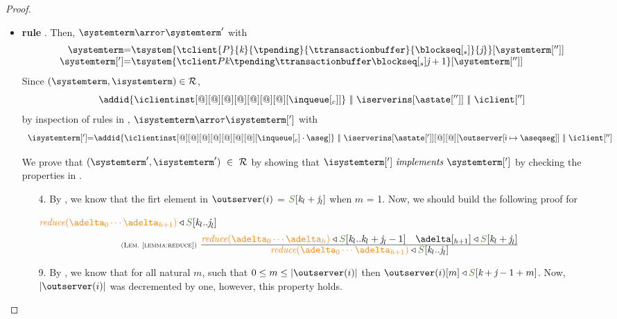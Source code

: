 \begin{proof}
\begin{itemize}
\begin{itemize}
\begin{enumerate}
					\end{enumerate}
				
				
				\item {\bf rule }. Then, $\systemterm  \arroi{\tau} \systemterm '$ with 
				\[\begin{array}{r@{=}l}
					\systemterm & \tsystem{\tclient{\tprogram}{\tknown}{\tpending}{\ttransactionbuffer}{\tsent}{\treceivebuffer}}[{\systemterm['']}]
					\\
					\systemterm['] & \tsystem{\tclienti{\tprogram}{\tknown}{\tpending}{\ttransactionbuffer}{\tsent}{\treceivebuffer+1}}[{\systemterm['']}]	
					
				  \end{array}
				\]
				Since $(\systemterm,\isystemterm)\in \mathcal{R}$,
				\[\addid{\iclientinst[@][@][@][@][@][@][@][\inclient]} \ \bigpar \ \iserverins[\astate['']] \ \bigpar\ \iclient['']\]
				by inspection of rules in \figref{}, 
				$\isystemterm \arroi{\tau} \isystemterm[']$ with
				\[\begin{array}{r@{=}l}
					\isystemterm['] & \addid{\iclientinst[@][@][@][@][@][@][@][\inclient\cdot \aseg]} \ \bigpar \ \iserverins[{\astate[']}][@][@][\outserver\upd{\cid}\aseqseg] \ \bigpar\ \iclient[''] \\
				  \end{array}		
				\]
				
				We  prove that $(\systemterm',\isystemterm') \ \in \ \mathcal{R}$ by showing that $\implements{\isystemterm[']}{\systemterm[']}$ 
				by checking the properties in .			

						\begin{itemize}
							\item[4.] By , we know that the firt element in $\outserver(i)$ = $\queuemessage[\tknown_l+\treceivebuffer_l]$ when $m$ = 1. Now, we should build the following proof for 
							
						${\ireduce{\adelta_0\cdots\adelta_{h+1}}\triangleleft  \queuemessage[\tknown_l..\treceivebuffer_l]} \ $
					\[
						  \mathrulean{\lemref{lemma:reduce}}
						  {
								\ireduce{\adelta_0\cdots\adelta_{h}}\triangleleft  \queuemessage[\tknown_l..\tknown_l+\treceivebuffer_l - 1]
								\quad 
								\adelta[_{h+1}] \triangleleft \queuemessage[\tknown_l + \treceivebuffer_l] 							
							}
  						{\ireduce{\adelta_0\cdots\adelta_{h+1}}\triangleleft  \queuemessage[\tknown_l..\treceivebuffer_l]}  
					\]
							\item[9.] By , we know that for all natural $m$, such that $0 \leq m \leq |\outserver(i)|$ then $\outserver(i)[m] \triangleleft \queuemessage[\tknown + \treceivebuffer - 1 + m]$. Now, $|\outserver(i)|$ was decremented by one, however, this property holds.
						\end{itemize}
					

\end{itemize}
\end{itemize}
\end{proof}
